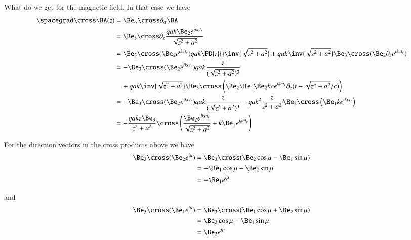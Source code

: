 {What do we get for the magnetic field.  In that case we have
%
\begin{equation}\label{eqn:relativisticElectrodynamicsExamReflection:1190}
\begin{aligned}
\spacegrad \cross \BA(z)
&=
\Be_\alpha \cross \partial_\alpha \BA \\
&=
\Be_3 \cross \partial_z \frac{q a k \Be_2 e^{i k c t_r} }{\sqrt{z^2 + a^2}}  \\
&=
\Be_3 \cross (\Be_2 e^{i  k c t_r} ) q a  k \PD{z}{} \inv{\sqrt{z^2 + a^2}}
+
q a  k \inv{\sqrt{z^2 + a^2}} \Be_3 \cross (\Be_2 \partial_z e^{i  k c t_r} ) \\
&=
-\Be_3 \cross (\Be_2 e^{i  k c t_r} ) q a  k \frac{z}{(\sqrt{z^2 + a^2})^3} \\
&\quad +
q a  k \inv{\sqrt{z^2 + a^2}} \Be_3 \cross \left( \Be_2 \Be_1 \Be_2 k c e^{i  k c t_r} \partial_z ( t - \sqrt{z^a + a^2}/c ) \right) \\
&=
-\Be_3 \cross (\Be_2 e^{i  k c t_r} ) q a  k \frac{z}{(\sqrt{z^2 + a^2})^3}
-
q a  k^2 \frac{z}{z^2 + a^2} \Be_3 \cross \left( \Be_1 k e^{i  k c t_r} \right) \\
&=
-\frac{q a k z \Be_3}{z^2 + a^2} \cross \left(
\frac{ \Be_2 e^{i k c t_r} }{\sqrt{z^2 + a^2}} + k \Be_1 e^{i k c t_r}
\right)
\end{aligned}
\end{equation}

For the direction vectors in the cross products above we have
%
\begin{equation}\label{eqn:relativisticElectrodynamicsExamReflection:1210}
\begin{aligned}
\Be_3 \cross (\Be_2 e^{i \mu})
&=
\Be_3 \cross (\Be_2 \cos\mu - \Be_1 \sin\mu) \\
&=
-\Be_1 \cos\mu - \Be_2 \sin\mu \\
&=
-\Be_1 e^{i \mu}
\end{aligned}
\end{equation}

and
%
\begin{equation}\label{eqn:relativisticElectrodynamicsExamReflection:1230}
\begin{aligned}
\Be_3 \cross (\Be_1 e^{i \mu})
&=
\Be_3 \cross (\Be_1 \cos\mu + \Be_2 \sin\mu) \\
&=
\Be_2 \cos\mu - \Be_1 \sin\mu \\
&=
\Be_2 e^{i \mu}
\end{aligned}
\end{equation}

}
